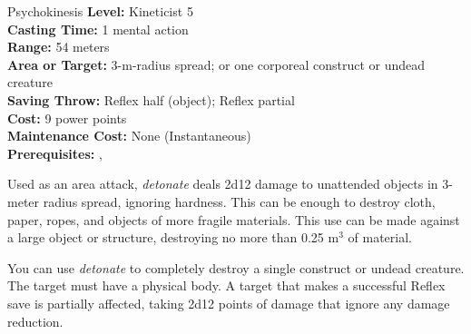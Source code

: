 {Psychokinesis}
{
	\textbf{Level:}
	Kineticist 5\\
	\textbf{Casting Time:}
	1 mental action\\
	\textbf{Range:}
	54 meters\\
	\textbf{Area or Target:}
	3-m-radius spread; or one corporeal construct or undead creature\\
	\textbf{Saving Throw:}
	Reflex half (object); Reflex partial\\
	\textbf{Cost:}
	9 power points\\
	\textbf{Maintenance Cost:}
	None (Instantaneous)\\
	\textbf{Prerequisites:}
	, \\
}
{
	Used as an area attack, \emph{detonate} deals 2d12 damage to unattended objects in 3-meter radius spread, ignoring hardness. This can be enough to destroy cloth, paper, ropes, and objects of more fragile materials. This use can be made against a large object or structure, destroying no more than 0.25 m$^3$ of material.

	You can use \emph{detonate} to completely destroy a single construct or undead creature. The target must have a physical body. A target that makes a successful Reflex save is partially affected, taking 2d12 points of damage that ignore any damage reduction.
}